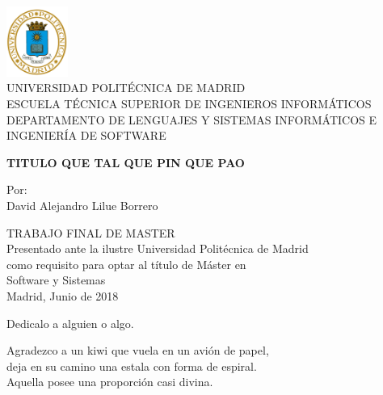 \documentclass[12pt,letterpaper,titlepage,oneside,openright]{book}
\begin{document}
\frontmatter

\begin{titlepage}
    \begin{center}
        \includegraphics[width=0.15\textwidth]{logo.png}\\
        {\large UNIVERSIDAD POLITÉCNICA DE MADRID}\\
        ESCUELA TÉCNICA SUPERIOR DE INGENIEROS INFORMÁTICOS\\
        DEPARTAMENTO DE LENGUAJES Y SISTEMAS INFORMÁTICOS E INGENIERÍA DE SOFTWARE

        \vspace{6em}

        \textbf{TITULO QUE TAL QUE PIN QUE PAO}

        \vspace{6em}

        Por:\\
        David Alejandro Lilue Borrero\\

        \vspace{6em}

        TRABAJO FINAL DE MASTER\\
        Presentado ante la ilustre Universidad Politécnica de Madrid\\
        como requisito para optar al título de Máster en\\
        Software y Sistemas\\
        
        \vfill
        Madrid, Junio de 2018
    \end{center}
\end{titlepage}

\newpage

\cleardoublepage
{}
{}
\begin{flushright}
Dedicalo a alguien o algo.
\end{flushright}

\newpage

\cleardoublepage
{}
{}
\begin{flushleft}
Agradezco a un kiwi que vuela en un avión de papel,\\
deja en su camino una estala con forma de espiral.\\
Aquella posee una proporción casi divina.
\end{flushleft}
\end{document}
